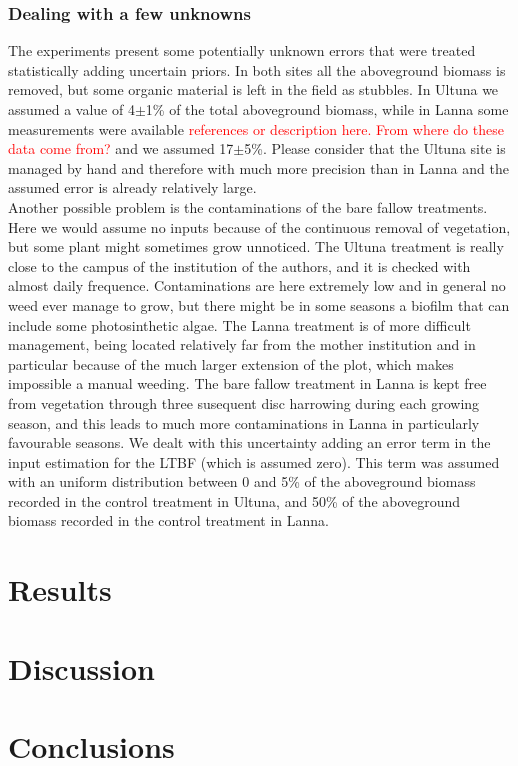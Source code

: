 \documentclass[review]{elsarticle}
\begin{document}
\subsubsection{Dealing with a few unknowns}
The experiments present some potentially unknown errors that were treated statistically adding uncertain priors. In both sites all the aboveground biomass is removed, but some organic material is left in the field as stubbles. In Ultuna we assumed a value of 4$\pm$1\% of the total aboveground biomass, while in Lanna some measurements were available \textcolor{red}{references or description here. From where do these data come from?} and we assumed 17$\pm$5\%. Please consider that the Ultuna site is managed by hand and therefore with much more precision than in Lanna and the assumed error is already relatively large.\\
Another possible problem is the contaminations of the bare fallow treatments. Here we would assume no inputs because of the continuous removal of vegetation, but some plant might sometimes grow unnoticed.
The Ultuna treatment is really close to the campus of the institution of the authors, and it is checked with almost daily frequence. Contaminations are here extremely low and in general no weed ever manage to grow, but there might be in some seasons a biofilm that can include some photosinthetic algae.
The Lanna treatment is of more difficult management, being located relatively far from the mother institution and in particular because of the much larger extension of the plot, which makes impossible a manual weeding. The bare fallow treatment in Lanna is kept free from vegetation through three susequent disc harrowing during each growing season, and this leads to much more contaminations in Lanna in particularly favourable seasons.
We dealt with this uncertainty adding an error term in the input estimation for the LTBF (which is assumed zero). This term was assumed with an uniform distribution between 0 and 5\% of the aboveground biomass recorded in the control treatment in Ultuna, and 50\% of the aboveground biomass recorded in the control treatment in Lanna.


\section{Results}

\section{Discussion}

\section{Conclusions}
\end{document}
